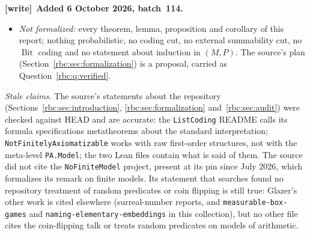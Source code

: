 \documentclass[11pt]{article}
\numberwithin{equation}{section}
\theoremstyle{definition}
\theoremstyle{remark}
\newcommand{\PA}{\mathsf{PA}}
\newcommand{\Bit}{\operatorname{Bit}}
\newcommand{\file}[1]{\nolinkurl{#1}}
\newenvironment{writenote}[1][]{\par\smallskip\begingroup\small
 \noindent\textbf{[write]}\if\relax\detokenize{#1}\relax\else~\textbf{#1.}\fi\ }%
 {\par\endgroup\smallskip}
\begin{document}
\begin{writenote}[Added 6 October 2026, batch~114]
\begin{itemize}
 \eqref{rbc:eq:induction-beta}. That is the step ``encode this externally
 finite list'' in the proof of Lemma~\ref{rbc:lem:induction-locally-finite}
 (for standard $n$). It is not
 Lemma~\ref{rbc:lem:induction-coding-equivalence}, whose sequences have a
 possibly nonstandard internal length $x$ and need the internal Chinese
 remainder theorem of $\PA$; the binary relation $\Bit$ of
 \eqref{rbc:eq:bit} is not formalized at all.
 \file{not_sat_inductionForm}, in
 \file{.../PAFiniteBasisReduction/EvaluatorCutContract.lean}: under that
 module's evaluator \file{Contract}, the induction instance of the specific
 formula \texttt{cutAt evalFormula} is false, because that formula defines
 exactly the standard elements (\file{sat_cutAt_iff_isStandard}; the sealed
 form is \file{not_sat_sealed_induction}). This is the pattern of
 Corollary~\ref{rbc:cor:induction-sigma-obstruction} and
 Lemma~\ref{rbc:lem:induction-locally-finite} (a formula that defines a
 proper successor-closed set containing $0$ refutes its own induction
 instance), but for a different formula and with no predicate $P$; it says
 nothing about $\chi$ or $\ell$. \file{raw_above_of_nonstandard} (in
 \file{FiniteBetaCoding.lean}): a nonstandard element lies above every
 numeral, the fact behind ``every standard index $i$ would satisfy $i<n$''
 in the same proof.
\item \emph{Not formalized:} every theorem, lemma, proposition and corollary
 of this report; nothing probabilistic, no coding cut, no external
 summability cut, no $\Bit$ coding and no statement about induction in
 $(M,P)$. The source's plan (Section~\ref{rbc:sec:formalization}) is a
 proposal, carried as Question~\ref{rbc:q:verified}.
\end{itemize}

\emph{Stale claims.} The source's statements about the repository
(Sections~\ref{rbc:sec:introduction}, \ref{rbc:sec:formalization}
and~\ref{rbc:sec:audit}) were checked against HEAD and are accurate: the
\file{ListCoding} README calls its formula specifications metatheorems about
the standard interpretation; \file{NotFinitelyAxiomatizable} works with raw
first-order structures, not with the meta-level \file{PA.Model}; the two Lean
files contain what is said of them. The source did not cite the
\file{NoFiniteModel} project, present at its pin since July 2026, which
formalizes its remark on finite models. Its statement that searches found
no repository treatment of random predicates or coin flipping is still
true: Glazer's other work is cited elsewhere (surreal-number reports, and
\file{measurable-box-games} and \file{naming-elementary-embeddings} in this
collection), but no other file cites the coin-flipping talk or treats
random predicates on models of arithmetic.


\end{writenote}
\end{document}
